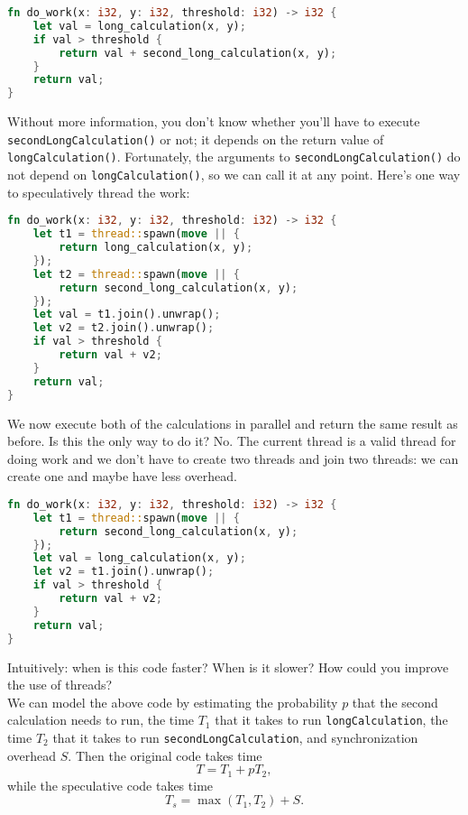 \begin{lstlisting}[language=Rust]
fn do_work(x: i32, y: i32, threshold: i32) -> i32 {
    let val = long_calculation(x, y);
    if val > threshold {
        return val + second_long_calculation(x, y);
    }
    return val;
}
\end{lstlisting}
Without more information, you don't know whether you'll have to execute
{\tt secondLongCalculation()} or not; it depends on the return value of
{\tt longCalculation()}.  Fortunately, the arguments to {\tt secondLongCalculation()} do not
depend on {\tt longCalculation()}, so we can call it at any point. 
Here's one way to speculatively thread the work:

\begin{lstlisting}[language=Rust]
fn do_work(x: i32, y: i32, threshold: i32) -> i32 {
    let t1 = thread::spawn(move || {
        return long_calculation(x, y);
    });
    let t2 = thread::spawn(move || {
        return second_long_calculation(x, y);
    });
    let val = t1.join().unwrap();
    let v2 = t2.join().unwrap();
    if val > threshold {
        return val + v2;
    }
    return val;
}
\end{lstlisting}
We now execute both of the calculations in parallel and return the same
result as before. Is this the only way to do it? No. The current thread is a valid thread for doing work and we don't have to create two threads and join two threads: we can create one and maybe have less overhead.

\begin{lstlisting}[language=Rust]
fn do_work(x: i32, y: i32, threshold: i32) -> i32 {
    let t1 = thread::spawn(move || {
        return second_long_calculation(x, y);
    });
    let val = long_calculation(x, y);
    let v2 = t1.join().unwrap();
    if val > threshold {
        return val + v2;
    }
    return val;
}
\end{lstlisting}

{\sf Intuitively: when is this code faster? When is it slower? How
  could you improve the use of threads?}\\[4em]

We can model the above code by estimating the probability $p$ that
the second calculation needs to run, the time $T_1$ that it takes
to run {\tt longCalculation}, the time $T_2$ that it takes to run
{\tt secondLongCalculation}, and synchronization overhead $S$.
Then the original code takes time
\[ T = T_1 + p T_2, \]
while the speculative code takes time
\[ T_s = \max(T_1, T_2) + S.\]

